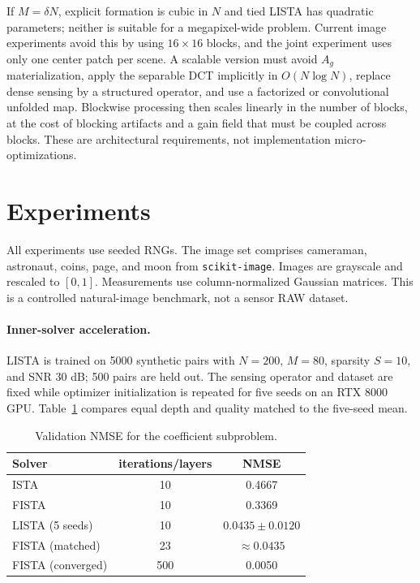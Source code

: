 \documentclass[anon]{opt2026}
\begin{document}
If $M=\delta N$, explicit formation is cubic in $N$ and tied LISTA has
quadratic parameters; neither is suitable for a megapixel-wide problem.
Current image experiments avoid this by using $16\times16$ blocks, and the
joint experiment uses only one center patch per scene.  A scalable version
must avoid $A_g$ materialization, apply the separable DCT implicitly in
$O(N\log N)$, replace dense sensing by a structured operator, and use a
factorized or convolutional unfolded map.  Blockwise processing then scales
linearly in the number of blocks, at the cost of blocking artifacts and a
gain field that must be coupled across blocks.  These are architectural
requirements, not implementation micro-optimizations.

\section{Experiments}

All experiments use seeded RNGs.  The image set comprises cameraman,
astronaut, coins, page, and moon from \texttt{scikit-image}.  Images are
grayscale and rescaled to $[0,1]$.  Measurements use column-normalized Gaussian
matrices.  This is a controlled natural-image benchmark, not a sensor RAW
dataset.

\paragraph{Inner-solver acceleration.}
LISTA is trained on 5000 synthetic pairs with $N=200$, $M=80$, sparsity
$S=10$, and SNR $30$ dB; 500 pairs are held out.  The sensing operator and
dataset are fixed while optimizer initialization is repeated for five seeds
on an RTX 8000 GPU.  Table~\ref{tab:lista} compares equal depth and quality
matched to the five-seed mean.

\begin{table}[ht]
\caption{Validation NMSE for the coefficient subproblem.}
\label{tab:lista}
\centering
\small
\begin{tabular}{lcc}
\toprule
Solver & iterations/layers & NMSE \\
\midrule
ISTA & 10 & 0.4667 \\
FISTA & 10 & 0.3369 \\
LISTA (5 seeds) & 10 & $\mathbf{0.0435\pm0.0120}$ \\
FISTA (matched) & 23 & $\approx0.0435$ \\
FISTA (converged) & 500 & 0.0050 \\
\bottomrule
\end{tabular}
\end{table}
\end{document}

